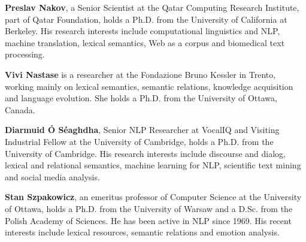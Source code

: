 \begin{bio}

\textbf{Preslav Nakov}, a Senior Scientist at the Qatar Computing
Research Institute, part of Qatar Foundation, holds a Ph.D. from the
University of California at Berkeley. His research interests include
computational linguistics and NLP, machine translation, lexical semantics,
Web as a corpus and biomedical text processing.

\textbf{Vivi Nastase} is a researcher at the Fondazione Bruno Kessler
in Trento, working mainly on lexical semantics, semantic relations,
knowledge acquisition and language evolution. She holds a Ph.D. from
the University of Ottawa, Canada.

\textbf{Diarmuid Ó Séaghdha}, Senior NLP Researcher at VocalIQ and
Visiting Industrial Fellow at the University of Cambridge, holds a
Ph.D. from the University of Cambridge. His research interests include
discourse and dialog, lexical and relational semantics, machine learning
for NLP, scientific text mining and social media analysis.

\textbf{Stan Szpakowicz}, an emeritus professor of Computer Science
at the University of Ottawa, holds a Ph.D. from the University of
Warsaw and a D.Sc. from the Polish Academy of Sciences. He has been
active in NLP since 1969. His recent interests include lexical resources,
semantic relations and emotion analysis.

  

\end{bio}

